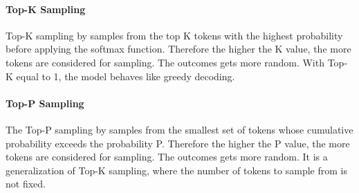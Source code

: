 \paragraph{Top-K Sampling}
Top-K sampling by \cite{Fan.13.05.2018} samples from the top K tokens with the highest probability before applying the softmax function. Therefore the higher the K value, the more tokens are considered for sampling. The outcomes gets more random. With Top-K equal to 1, the model behaves like greedy decoding.

\paragraph{Top-P Sampling}
The Top-P sampling by \cite{Holtzman.22.04.2019} samples from the smallest set of tokens whose cumulative probability exceeds the probability P. Therefore the higher the P value, the more tokens are considered for sampling. The outcomes gets more random. It is a generalization of Top-K sampling, where the number of tokens to sample from is not fixed.